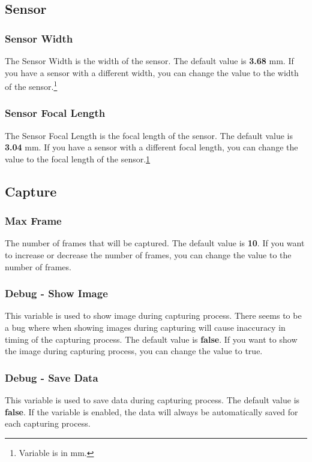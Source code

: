 \subsection{Sensor}

\subsubsection{Sensor Width}
The Sensor Width is the width of the sensor. The default value is \textbf{3.68} mm. If you have a sensor with a different width, you can change the value to the width of the sensor.\footnote{\label{label2}Variable is in mm.}

\subsubsection{Sensor Focal Length}
The Sensor Focal Length is the focal length of the sensor. The default value is \textbf{3.04} mm. If you have a sensor with a different focal length, you can change the value to the focal length of the sensor.\cref{label2}

\subsection{Capture}

\subsubsection{Max Frame}
The number of frames that will be captured. The default value is \textbf{10}. If you want to increase or decrease the number of frames, you can change the value to the number of frames.

\subsubsection{Debug - Show Image}
This variable is used to show image during capturing process. There seems to be a bug where when showing images during capturing will cause inaccuracy in timing of the capturing process. The default value is \textbf{false}. If you want to show the image during capturing process, you can change the value to true.

\subsubsection{Debug - Save Data}
This variable is used to save data during capturing process. The default value is \textbf{false}. If the variable is enabled, the data will always be automatically saved for each capturing process.

